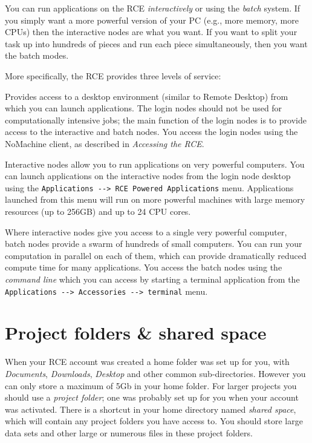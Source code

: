 \documentclass[]{book}
\providecommand{\tightlist}{%
  \setlength{\itemsep}{0pt}\setlength{\parskip}{0pt}}
\begin{document}
You can run applications on the RCE \emph{interactively} or using the
\emph{batch} system. If you simply want a more powerful version of your
PC (e.g., more memory, more CPUs) then the interactive nodes are what
you want. If you want to split your task up into hundreds of pieces and
run each piece simultaneously, then you want the batch modes.

More specifically, the RCE provides three levels of service:

\begin{description}
\tightlist
\item[\textbf{Login nodes}]
Provides access to a desktop environment (similar to Remote Desktop)
from which you can launch applications. The login nodes should not be
used for computationally intensive jobs; the main function of the login
nodes is to provide access to the interactive and batch nodes. You
access the login nodes using the NoMachine client, as described in
\emph{Accessing the RCE}.
\item[\textbf{Interactive nodes}]
Interactive nodes allow you to run applications on very powerful
computers. You can launch applications on the interactive nodes from the
login node desktop using the
\texttt{Applications\ -\/-\textgreater{}\ RCE\ Powered\ Applications}
menu. Applications launched from this menu will run on more powerful
machines with large memory resources (up to 256GB) and up to 24 CPU
cores.
\item[\textbf{Batch nodes}]
Where interactive nodes give you access to a single very powerful
computer, batch nodes provide a swarm of hundreds of small computers.
You can run your computation in parallel on each of them, which can
provide dramatically reduced compute time for many applications. You
access the batch nodes using the \emph{command line} which you can
access by starting a terminal application from the
\texttt{Applications\ -\/-\textgreater{}\ Accessories\ -\/-\textgreater{}\ terminal}
menu.
\end{description}

\section{Project folders \& shared
space}\label{project-folders-shared-space}

When your RCE account was created a home folder was set up for you, with
\emph{Documents}, \emph{Downloads}, \emph{Desktop} and other common
sub-directories. However you can only store a maximum of 5Gb in your
home folder. For larger projects you should use a \emph{project folder};
one was probably set up for you when your account was activated. There
is a shortcut in your home directory named \emph{shared space}, which
will contain any project folders you have access to. You should store
large data sets and other large or numerous files in these project
folders.
\end{document}
